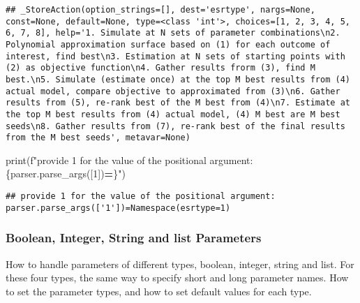 \documentclass[
]{book}
\newenvironment{Shaded}{\begin{snugshade}}{\end{snugshade}}
\newcommand{\BuiltInTok}[1]{#1}
\newcommand{\NormalTok}[1]{#1}
\newcommand{\OperatorTok}[1]{\textcolor[rgb]{0.81,0.36,0.00}{\textbf{#1}}}
\newcommand{\SpecialCharTok}[1]{\textcolor[rgb]{0.00,0.00,0.00}{#1}}
\newcommand{\SpecialStringTok}[1]{\textcolor[rgb]{0.31,0.60,0.02}{#1}}
\newcommand{\StringTok}[1]{\textcolor[rgb]{0.31,0.60,0.02}{#1}}
\begin{document}
\begin{verbatim}
## _StoreAction(option_strings=[], dest='esrtype', nargs=None, const=None, default=None, type=<class 'int'>, choices=[1, 2, 3, 4, 5, 6, 7, 8], help='1. Simulate at N sets of parameter combinations\n2. Polynomial approximation surface based on (1) for each outcome of interest, find best\n3. Estimation at N sets of starting points with (2) as objective function\n4. Gather results frorm (3), find M best.\n5. Simulate (estimate once) at the top M best results from (4) actual model, compare objective to approximated from (3)\n6. Gather results from (5), re-rank best of the M best from (4)\n7. Estimate at the top M best results from (4) actual model, (4) M best are M best seeds\n8. Gather results from (7), re-rank best of the final results from the M best seeds', metavar=None)
\end{verbatim}

\begin{Shaded}
\begin{Highlighting}[]
\BuiltInTok{print}\NormalTok{(}\SpecialStringTok{f"provide 1 for the value of the positional argument: }\SpecialCharTok{\{}\NormalTok{parser}\SpecialCharTok{.}\NormalTok{parse\_args([}\StringTok{\textquotesingle{}1\textquotesingle{}}\NormalTok{])}\OperatorTok{=}\SpecialCharTok{\}}\SpecialStringTok{"}\NormalTok{)}
\end{Highlighting}
\end{Shaded}

\begin{verbatim}
## provide 1 for the value of the positional argument: parser.parse_args(['1'])=Namespace(esrtype=1)
\end{verbatim}

\hypertarget{boolean-integer-string-and-list-parameters}{%
\subsubsection{Boolean, Integer, String and list Parameters}\label{boolean-integer-string-and-list-parameters}}

How to handle parameters of different types, boolean, integer, string and list. For these four types, the same way to specify short and long parameter names. How to set the parameter types, and how to set default values for each type.
\end{document}
